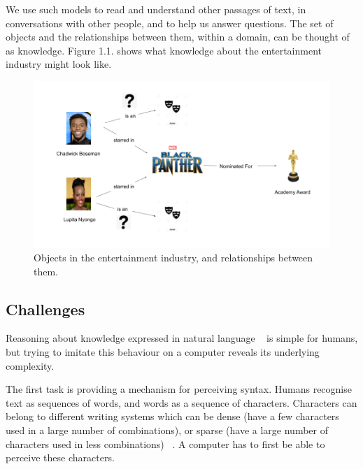 \noindent We use such models to read and understand other passages of text, in conversations with other people, and to help us answer questions. The set of objects and the relationships between them, within a domain, can be thought of as knowledge. Figure 1.1. shows what knowledge about the entertainment industry might look like. \newline

\begin{figure}
   	\centering
    	\includegraphics[width=\textwidth]{Objects_and_the_Relationships_Between_Them}
	\caption{Objects in the entertainment industry, and relationships between them.}
\end{figure}

\subsection{Challenges} 

Reasoning about knowledge expressed in natural language \unskip~\citep{minervini2019differentiable} is simple for humans, but trying to imitate this behaviour on a computer reveals its underlying complexity. \par

\noindent The first task is providing a mechanism for perceiving syntax. Humans recognise text as sequences of words, and words as a sequence of characters. Characters can belong to different writing systems which can be dense (have a few characters used in a large number of combinations), or sparse (have a large number of characters used in less combinations) \unskip~\citep{Hua2010}. A computer has to first be able to perceive these characters. \par

